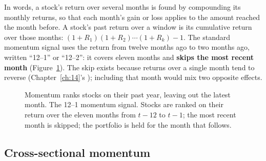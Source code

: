 In words, a stock's return over several months is found by compounding its monthly returns, so that each month's gain or loss applies to the amount reached the month before. A stock's past return over a window is its cumulative return over those months: $(1 + R_1)(1 + R_2)\cdots(1 + R_k) - 1$. The standard momentum signal uses the return from twelve months ago to two months ago, written ``12--1'' or ``12--2'': it covers eleven months and \textbf{skips the most recent month} (Figure~\ref{fig:05-signal}). The skip exists because returns over a single month tend to reverse (Chapter~\ref{ch:14}'s ); including that month would mix two opposite effects.

\begin{figure}[htbp]
\centering
{}
\caption{Momentum ranks stocks on their past year, leaving out the latest month. The 12--1 momentum signal. Stocks are ranked on their return over the eleven months from $t-12$ to $t-1$; the most recent month is skipped; the portfolio is held for the month that follows.}
\label{fig:05-signal}
\end{figure}

\subsection{Cross-sectional momentum}


